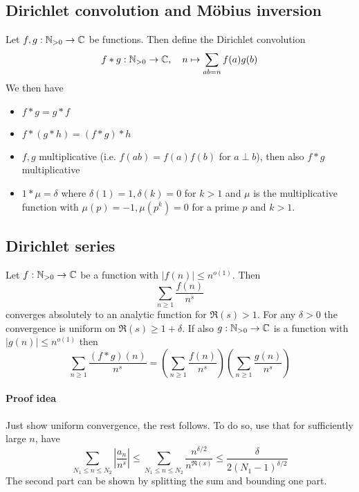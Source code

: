 
\subsection{Dirichlet convolution and Möbius inversion}
Let $f, g: \mathbb{N}_{>0} \to \mathbb{C}$ be functions. Then define the Dirichlet convolution
\begin{equation*}
    f * g: \mathbb{N}_{>0} \to \mathbb{C}, \quad n \mapsto \sum_{ab = n} f(a) g(b)
\end{equation*}
We then have
\begin{itemize}
    \item $f * g = g * f$
    \item $f * (g * h) = (f * g) * h$
    \item $f, g$ multiplicative (i.e. $f(ab) = f(a)f(b)$ for $a \perp b$), then also $f * g$ multiplicative
    \item $1 * \mu = \delta$ where $\delta(1) = 1, \delta(k) = 0$ for $k > 1$ and $\mu$ is the multiplicative function with $\mu(p) = -1, \mu(p^k) = 0$ for a prime $p$ and $k > 1$.
\end{itemize}

\subsection{Dirichlet series}
Let $f: \mathbb{N}_{> 0} \to \mathbb{C}$ be a function with $|f(n)| \leq n^{o(1)}$. Then
\begin{equation*}
    \sum_{n \geq 1} \frac {f(n)} {n^s}
\end{equation*}
converges absolutely to an analytic function for $\Re(s) > 1$.
For any $\delta > 0$ the convergence is uniform on $\Re(s) \geq 1 + \delta$.
If also $g: \mathbb{N}_{> 0} \to \mathbb{C}$ is a function with $|g(n)| \leq n^{o(1)}$ then
\begin{equation*}
    \sum_{n \geq 1} \frac {(f * g)(n)} {n^s} = \left( \sum_{n \geq 1} \frac {f(n)} {n^s} \right)\left( \sum_{n \geq 1} \frac {g(n)} {n^s} \right)
\end{equation*}
\paragraph{Proof idea} Just show uniform convergence, the rest follows. To do so, use that for sufficiently large $n$, have
\begin{equation*}
    \sum_{N_1 \leq n \leq N_2} \left| \frac {a_n} {n^s} \right| \leq \sum_{N_1 \leq n \leq N_2} \frac {n^{\delta/2}} {n^{\Re(s)}} \leq \frac {\delta} {2(N_1 - 1)^{\delta/2}}
\end{equation*}
The second part can be shown by splitting the sum and bounding one part.

